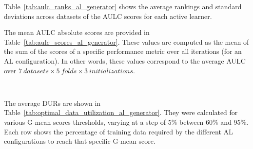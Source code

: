 Table~\ref{tab:aulc_ranks_al_generator} shows the average rankings and standard deviations
across datasets of the AULC scores for each active learner.

\begin{table}
    \centering
    \caption[Mean rankings of the AULC metric.]{%
        Mean rankings of the AULC metric over the different datasets (7),
        folds (5) and runs (3) used in the experiment. This means that the use
        of G-SMOTE almost always improves the results of the original
        framework.
    }\label{tab:aulc_ranks_al_generator}
\end{table}

The mean AULC absolute scores are provided in Table~\ref{tab:aulc_scores_al_generator}.
These values are computed as the mean of the sum of the scores of a specific
performance metric over all iterations (for an AL configuration). In other
words, these values correspond to the average AULC over $7\ datasets \times 5\
folds \times 3\ initializations$.

\begin{table}
    \centering
    \caption[Average AULC of each AL configuration tested.]{%
        Average AULC of each AL configuration tested. Each AULC score is
        calculated using the G-mean scores of each iteration in the validation
        set. By the end of the iterative process, each AL configuration used a
        total of 750 instances of the 960 instances that compose the training
        set.
    }~\label{tab:aulc_scores_al_generator}
\end{table}

The average DURs are shown in Table~\ref{tab:optimal_data_utilization_al_generator}. They
were calculated for various G-mean scores thresholds, varying at a step of 5\%
between 60\% and 95\%. Each row shows the percentage of training data required
by the different AL configurations to reach that specific G-mean score.

